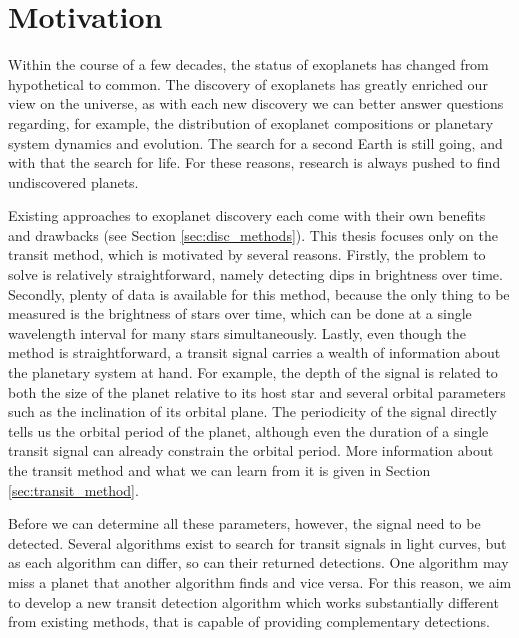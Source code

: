 
\section{Motivation}

Within the course of a few decades, the status of exoplanets has changed from hypothetical to common. The discovery of exoplanets has greatly enriched our view on the universe, as with each new discovery we can better answer questions regarding, for example, the distribution of exoplanet compositions or planetary system dynamics and evolution. The search for a second Earth is still going, and with that the search for life. For these reasons, research is always pushed to find undiscovered planets.

Existing approaches to exoplanet discovery each come with their own benefits and drawbacks (see Section \ref{sec:disc_methods}). This thesis focuses only on the transit method, which is motivated by several reasons. Firstly, the problem to solve is relatively straightforward, namely detecting dips in brightness over time. Secondly, plenty of data is available for this method, because the only thing to be measured is the brightness of stars over time, which can be done at a single wavelength interval for many stars simultaneously. Lastly, even though the method is straightforward, a transit signal carries a wealth of information about the planetary system at hand. For example, the depth of the signal is related to both the size of the planet relative to its host star and several orbital parameters such as the inclination of its orbital plane. The periodicity of the signal directly tells us the orbital period of the planet, although even the duration of a single transit signal can already constrain the orbital period. More information about the transit method and what we can learn from it is given in Section \ref{sec:transit_method}. 

Before we can determine all these parameters, however, the signal need to be detected. Several algorithms exist to search for transit signals in light curves, but as each algorithm can differ, so can their returned detections. One algorithm may miss a planet that another algorithm finds and vice versa. For this reason, we aim to develop a new transit detection algorithm which works substantially different from existing methods, that is capable of providing complementary detections.


